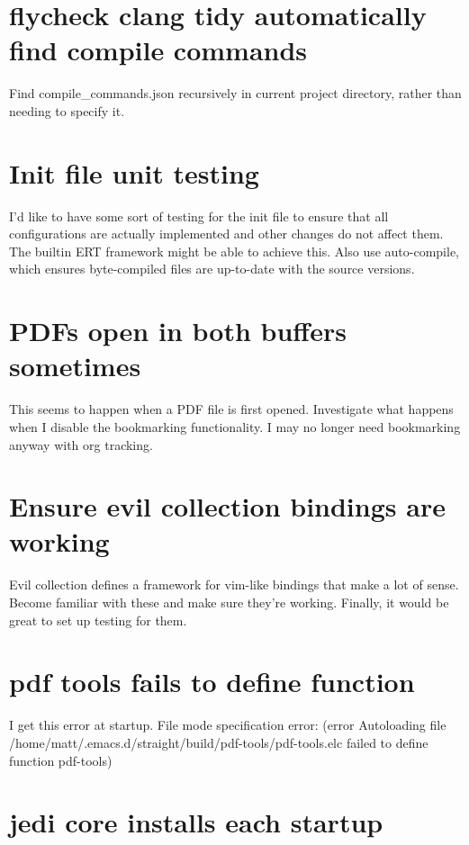 \documentclass{default}
\begin{document}
\section{flycheck clang tidy automatically find compile commands}

Find compile\_commands.json recursively in current project directory, rather than needing to specify
it.

\section{Init file unit testing}

I'd like to have some sort of testing for the init file to ensure that all configurations are
actually implemented and other changes do not affect them. The builtin ERT framework might be able
to achieve this. Also use auto-compile, which ensures byte-compiled files are up-to-date with the
source versions.

\section{PDFs open in both buffers sometimes}

This seems to happen when a PDF file is first opened. Investigate what happens when I disable the
bookmarking functionality. I may no longer need bookmarking anyway with org tracking.

\section{Ensure evil collection bindings are working}

Evil collection defines a framework for vim-like bindings that make a lot of sense. Become familiar
with these and make sure they're working. Finally, it would be great to set up testing for them.

\section{pdf tools fails to define function}

I get this error at startup. File mode specification error: (error Autoloading file /home/matt/.emacs.d/straight/build/pdf-tools/pdf-tools.elc failed to define function pdf-tools)

\section{jedi core installs each startup}
\end{document}
